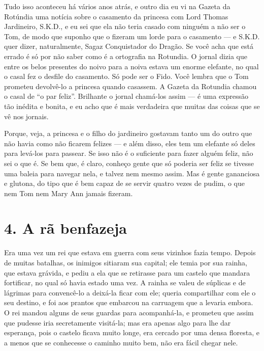 Tudo isso aconteceu há vários anos atrás, e outro dia eu vi na Gazeta
da Rotúndia uma notícia sobre o casamento da princesa com Lord Thomas
Jardineiro, S.K.D., e eu sei que ela não teria casado com ninguém a
não ser o Tom, de modo que suponho que o fizeram um lorde para o
casamento — e S.K.D. quer dizer, naturalmente, Sagaz Conquistador do
Dragão. Se você acha que está errado é só por não saber como é a
ortografia na Rotundia. O jornal dizia que entre os belos presentes
do noivo para a noiva estava um enorme elefante, no qual o casal fez
o desfile do casamento. Só pode ser o Fido. Você lembra que o Tom
prometeu devolvê-lo a princesa quando casassem. A Gazeta da Rotundia
chamou o casal de “o par feliz”. Brilhante o jornal chamá-los assim —
é uma expressão tão inédita e bonita, e eu acho que é mais verdadeira
que muitas das coisas que se vê nos jornais.

Porque, veja, a princesa e o filho do jardineiro gostavam tanto um do
outro que não havia como não ficarem felizes — e além disso, eles tem
um elefante só deles para levá-los para passear. Se isso não é o
suficiente para fazer alguém feliz, não sei o que é. Se bem que, é
claro, conheço gente que só poderia ser feliz se tivesse uma baleia
para navegar nela, e talvez nem mesmo assim. Mas é gente gananciosa e
glutona, do tipo que é bem capaz de se servir quatro vezes de pudim,
o que nem Tom nem Mary Ann jamais fizeram.

\chapter{4. A rã benfazeja}

Era uma vez um rei que estava em guerra com seus vizinhos fazia tempo.
Depois de muitas batalhas, os inimigos sitiaram sua capital; ele
temia por sua rainha, que estava grávida, e pediu a ela que se
retirasse para um castelo que mandara fortificar, no qual só havia
estado uma vez. A rainha se valeu de súplicas e de lágrimas para
convencê-lo a deixá-la ficar com ele; queria compartilhar com ele o
seu destino, e foi aos prantos que embarcou na carruagem que a
levaria embora. O rei mandou alguns de seus guardas para
acompanhá-la, e prometeu que assim que pudesse iria secretamente
visitá-la; mas era apenas algo para lhe dar esperança, pois o castelo
ficava muito longe, era cercado por uma densa floresta, e a menos que
se conhecesse o caminho muito bem, não era fácil chegar nele.


